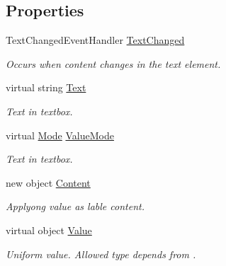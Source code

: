 \subsection*{Properties}
\begin{DoxyCompactItemize}
\item 
Text\+Changed\+Event\+Handler \mbox{\hyperlink{class_wpf_handler_1_1_u_i_1_1_controls_1_1_text_field_control_a402232775f61db3f7b693c1771993324}{Text\+Changed}}
\begin{DoxyCompactList}\small\item\em Occurs when content changes in the text element. \end{DoxyCompactList}\item 
virtual string \mbox{\hyperlink{class_wpf_handler_1_1_u_i_1_1_controls_1_1_text_field_control_a33311103774ab41a0af23f6181ef7d2c}{Text}}
\begin{DoxyCompactList}\small\item\em Text in textbox. \end{DoxyCompactList}\item 
virtual \mbox{\hyperlink{class_wpf_handler_1_1_u_i_1_1_controls_1_1_text_field_control_a99939f3d8500812661376afa5ee1a31d}{Mode}} \mbox{\hyperlink{class_wpf_handler_1_1_u_i_1_1_controls_1_1_text_field_control_a3d56cbedf03f93150117a1d999b828dc}{Value\+Mode}}
\begin{DoxyCompactList}\small\item\em Text in textbox. \end{DoxyCompactList}\item 
new object \mbox{\hyperlink{class_wpf_handler_1_1_u_i_1_1_controls_1_1_text_field_control_ab4b06ba1470f467c920ad28f100a4ae2}{Content}}
\begin{DoxyCompactList}\small\item\em Applyong value as lable content. \end{DoxyCompactList}\item 
virtual object \mbox{\hyperlink{class_wpf_handler_1_1_u_i_1_1_controls_1_1_text_field_control_a3ddca328a79686b354a61f609abc163b}{Value}}
\begin{DoxyCompactList}\small\item\em Uniform value. Allowed type depends from . \end{DoxyCompactList}\item 

\end{DoxyCompactItemize}
